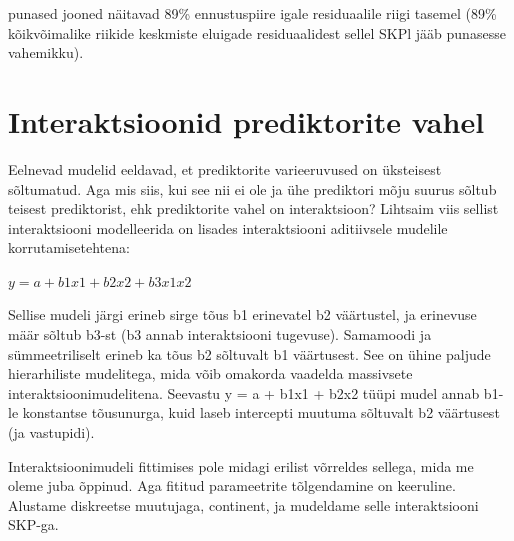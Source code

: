 \documentclass[]{book}
\begin{document}
punased jooned näitavad 89\% ennustuspiire igale residuaalile riigi tasemel (89\% kõikvõimalike riikide keskmiste eluigade residuaalidest sellel SKPl jääb punasesse vahemikku).

\hypertarget{interaktsioonid-prediktorite-vahel}{%
\section*{Interaktsioonid prediktorite vahel}\label{interaktsioonid-prediktorite-vahel}}

Eelnevad mudelid eeldavad, et prediktorite varieeruvused on üksteisest sõltumatud. Aga mis siis, kui see nii ei ole ja ühe prediktori mõju suurus sõltub teisest prediktorist, ehk prediktorite vahel on interaktsioon? Lihtsaim viis sellist interaktsiooni modelleerida on lisades interaktsiooni aditiivsele mudelile korrutamisetehtena:

\(y = a + b1x1 + b2x2 + b3x1x2\)

Sellise mudeli järgi erineb sirge tõus b1 erinevatel b2 väärtustel, ja erinevuse määr sõltub b3-st (b3 annab interaktsiooni tugevuse). Samamoodi ja sümmeetriliselt erineb ka tõus b2 sõltuvalt b1 väärtusest. See on ühine paljude hierarhiliste mudelitega, mida võib omakorda vaadelda massivsete interaktsioonimudelitena. Seevastu y = a + b1x1 + b2x2 tüüpi mudel annab b1-le konstantse tõusunurga, kuid laseb intercepti muutuma sõltuvalt b2 väärtusest (ja vastupidi).

Interaktsioonimudeli fittimises pole midagi erilist võrreldes sellega, mida me oleme juba õppinud. Aga fititud parameetrite tõlgendamine on keeruline.
Alustame diskreetse muutujaga, continent, ja mudeldame selle interaktsiooni SKP-ga.
\end{document}
